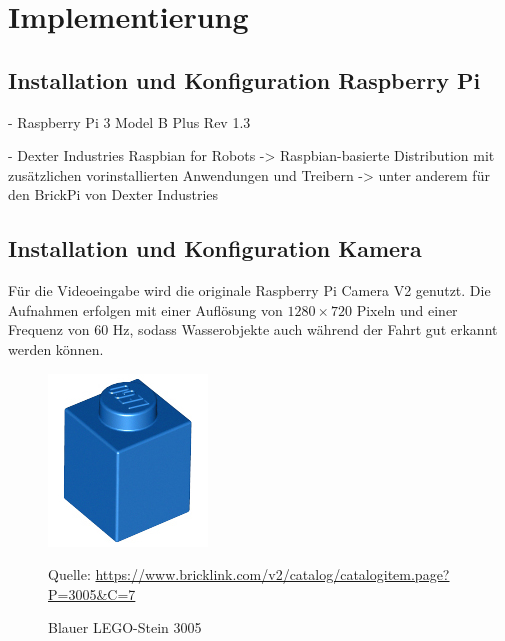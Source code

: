 \chapter{Implementierung}
\label{chp:implementierung}

\section{Installation und Konfiguration Raspberry Pi}
\label{sec:inst_konf_raspi}


- Raspberry Pi 3 Model B Plus Rev 1.3

- Dexter Industries Raspbian for Robots -> Raspbian-basierte Distribution mit zusätzlichen vorinstallierten Anwendungen und Treibern -> unter anderem für den BrickPi von Dexter Industries

\section{Installation und Konfiguration Kamera}
\label{sec:inst_konf_kamera}

Für die Videoeingabe wird die originale Raspberry Pi Camera V2 genutzt.
Die Aufnahmen erfolgen mit einer Auflösung von $1280 \times 720$ Pixeln und einer Frequenz von 60 Hz, sodass Wasserobjekte auch während der Fahrt gut erkannt werden können.

\begin{figure}
	\centering
	\includegraphics[width=0.9\linewidth]{../Images/3005.png}
	\vspace{0.5em}
	\parbox[c]{0.8\linewidth}{\footnotesize
		\centering
		\vspace{1em}
		Quelle: \url{https://www.bricklink.com/v2/catalog/catalogitem.page?P=3005\&C=7}
	}
	\captionsetup{format=plain}
	\caption{Blauer LEGO-Stein 3005}
	\label{fig:lego3005}
\end{figure}

